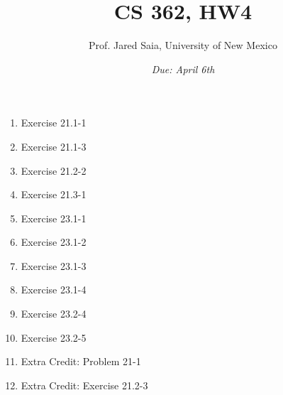 \documentclass[11pt]{article}
\begin{document}
\title{CS 362, HW4}

\author {Prof. Jared Saia, University of New Mexico}

\date{\emph{Due: April 6th }}
\maketitle

\begin{enumerate}

\item Exercise 21.1-1

\item Exercise 21.1-3

\item Exercise 21.2-2

\item Exercise 21.3-1

\item Exercise 23.1-1

\item Exercise 23.1-2

\item Exercise 23.1-3

\item Exercise 23.1-4

\item Exercise 23.2-4

\item Exercise 23.2-5

\item Extra Credit: Problem 21-1

\item Extra Credit: Exercise 21.2-3


\end{enumerate}
\end{document}
